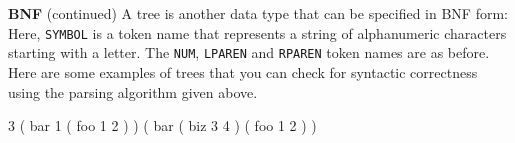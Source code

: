 \begin{minipage}[t]{\sw}
\slidenumber
\LARGE
{\bf BNF} (continued)\exx
A tree is another data type that can be specified in BNF form:\exx
\emm{\NormalBox{\MYtree}}\exx
Here, \verb'SYMBOL' is a token name that represents a string
of alphanumeric characters starting with a letter.
The \verb'NUM', \verb'LPAREN' and \verb'RPAREN' token names are as before.\exx
Here are some examples of trees
that you can check for syntactic correctness
using the parsing algorithm given above.
\begin{qv}
3
( bar 1 ( foo 1 2 ) )
( bar ( biz 3 4 ) ( foo 1 2 ) )
\end{qv}
\end{minipage}
\clearpage

